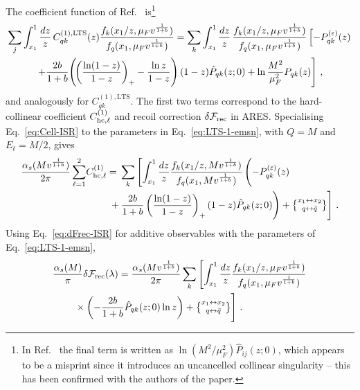 The coefficient function of Ref.~\cite{vanBeekveld:2025zjh}
is\footnote{In Ref.~\cite{vanBeekveld:2025zjh} the final term is
written as $\ln(M^2/\mu_F^2)\hat{P}_{ij}(z;0)$, which appears to be
a misprint since it introduces an uncancelled collinear singularity --
this has been confirmed with the authors of the paper.}
\begin{multline}
  \label{eq:CkiLTS}
  \sum_j\int_{x_1}^1\frac{dz}{z}\,C_{qk}^{(1),\rm LTS}(z)
  \frac{f_k(x_1/z,\mu_F v^{\frac{1}{1+b}})}
  {f_q(x_1,\mu_F v^{\frac{1}{1+b}})}   = \sum_k\int_{x_1}^1\frac{dz}{z}\,
  \frac{f_k(x_1/z,\mu_F v^{\frac{1}{1+b}})}
  {f_q(x_1,\mu_F v^{\frac{1}{1+b}})}
  \left[-P_{qk}^{(\varepsilon)}(z)\right.\\
  \left.+\frac{2b}{1+b}\!\left(\!
  \left(\frac{\ln(1-z)}{1-z}\right)_+
  -\frac{\ln z}{1-z}\right)
  (1-z)\hat{P}_{qk}(z;0)
  +\ln\frac{M^2}{\mu_F^2}P_{qk}(z)\right]\,,
\end{multline}
and analogously for $C_{\bar{q}k}^{(1),\mathrm{LTS}}$.
The first two terms correspond to the hard-collinear coefficient
$C_{{\rm hc},\ell}^{(1)}$ and recoil correction
$\delta\mathcal{F}_{\rm rec}$ in \textsc{ARES}. Specialising
Eq.~\eqref{eq:Cell-ISR} to the parameters in Eq.~\eqref{eq:LTS-1-emsn},
with $Q=M$ and $E_\ell=M/2$, gives
\begin{align}
  \frac{\alpha_s(Mv^{\frac{1}{1+b}})}{2\pi}\sum_{\ell=1}^2
  &C_{{\rm hc},\ell}^{(1)} ={}\sum_k\left[\int_{x_1}^1\frac{dz}{z}
  \frac{f_k(x_1/z,Mv^{\frac{1}{1+b}})}
  {f_q(x_1,Mv^{\frac{1}{1+b}})}
  \left(-P_{qk}^{(\varepsilon)}(z)\vphantom{\left(\frac{\ln(1-z)}{1-z}\right)_+}\right.\right.\nonumber\\
  &\qquad\left.\left.\vphantom{\frac{f_k(x_1/z,Mv^{\frac{1}{1+b}})}{f_q(x_1,Mv^{\frac{1}{1+b}})}}+\frac{2b}{1+b}
  \left(\frac{\ln(1-z)}{1-z}\right)_+(1-z)\hat{P}_{qk}(z;0)
  \right)+\left\{\substack{x_1\leftrightarrow x_2\\[0.5ex] q\leftrightarrow\bar{q}}\right\}\right]\,. \label{eq:Cij-LTS-comp}
\end{align}
Using Eq.~\eqref{eq:dFrec-ISR} for additive observables with the
parameters of Eq.~\eqref{eq:LTS-1-emsn},
\begin{align}
  &\frac{\alpha_s(M)}{\pi}\delta\mathcal{F}_{\rm rec}(\lambda) ={}
  \frac{\alpha_s(Mv^{\frac{1}{1+b}})}{2\pi}
  \sum_k\left[\int_{x_1}^1\frac{dz}{z}
  \frac{f_k(x_1/z,\mu_F v^{\frac{1}{1+b}})}
  {f_q(x_1,\mu_F v^{\frac{1}{1+b}})}\right.\nonumber\\
  &\qquad\left.\vphantom{\frac{f_k(x_1/z,\mu_F v^{\frac{1}{1+b}})}{f_q(x_1,\mu_F v^{\frac{1}{1+b}})}}\times\left(-\frac{2b}{1+b}\hat{P}_{qk}(z;0)\ln z\right)+\left\{\substack{x_1\leftrightarrow x_2\\[0.5ex] q\leftrightarrow\bar{q}}\right\}\right]\,. \label{eq:dFrec-LTS-comp}
\end{align}
